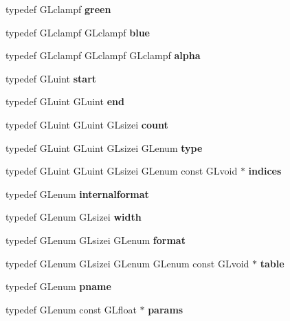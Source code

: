 \begin{DoxyCompactItemize}
\item 
typedef G\+Lclampf {\bfseries green}\label{_s_d_l__opengl_8h_ac57fb4e15aa855fa227d97909b37ed5b}

\item 
typedef G\+Lclampf G\+Lclampf {\bfseries blue}\label{_s_d_l__opengl_8h_af7c76492ef0f7ddda2f5f079041e5a8e}

\item 
typedef G\+Lclampf G\+Lclampf G\+Lclampf {\bfseries alpha}\label{_s_d_l__opengl_8h_a1e566ae365860db53d0c241c526b52c3}

\item 
typedef G\+Luint {\bfseries start}\label{_s_d_l__opengl_8h_ac55adc720a3098c1b454d2a4647f4361}

\item 
typedef G\+Luint G\+Luint {\bfseries end}\label{_s_d_l__opengl_8h_a432111147038972f06e049e18a837002}

\item 
typedef G\+Luint G\+Luint G\+Lsizei {\bfseries count}\label{_s_d_l__opengl_8h_a7ec41a71042dd94e554df761eed6b51b}

\item 
typedef G\+Luint G\+Luint G\+Lsizei G\+Lenum {\bfseries type}\label{_s_d_l__opengl_8h_a7d05960f4f1c1b11f3177dc963a45d86}

\item 
typedef G\+Luint G\+Luint G\+Lsizei G\+Lenum const G\+Lvoid $\ast$ {\bfseries indices}\label{_s_d_l__opengl_8h_a0c1a6a349ce1520ca0284e13dcad1f86}

\item 
typedef G\+Lenum {\bfseries internalformat}\label{_s_d_l__opengl_8h_ab90692d7f8e57332a86e3885cdcfa784}

\item 
typedef G\+Lenum G\+Lsizei {\bfseries width}\label{_s_d_l__opengl_8h_a3ce386e55bbeb900c1b23e064b89bd04}

\item 
typedef G\+Lenum G\+Lsizei G\+Lenum {\bfseries format}\label{_s_d_l__opengl_8h_ae2d3db041c6004a67047659b42f73a44}

\item 
typedef G\+Lenum G\+Lsizei G\+Lenum G\+Lenum const G\+Lvoid $\ast$ {\bfseries table}\label{_s_d_l__opengl_8h_a65df8075f44f790953a8a10f65eba61f}

\item 
typedef G\+Lenum {\bfseries pname}\label{_s_d_l__opengl_8h_abb493b3183a1e1ed57486f1c438c82a9}

\item 
typedef G\+Lenum const G\+Lfloat $\ast$ {\bfseries params}\label{_s_d_l__opengl_8h_a0c3f189cf7c3f1dc1856734dd3808249}


\end{DoxyCompactItemize}
